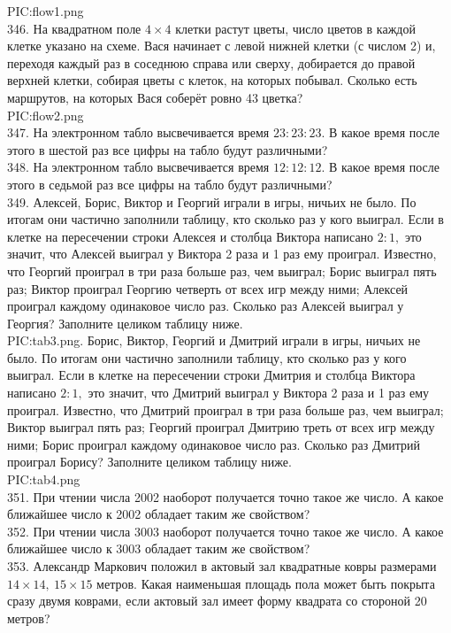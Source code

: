 {{PIC:flow1.png}}\\
346. На квадратном поле $4\times4$ клетки растут цветы, число цветов в каждой клетке указано на схеме. Вася начинает с левой нижней клетки (с числом 2) и, переходя каждый раз в соседнюю справа или сверху, добирается до правой верхней клетки, собирая цветы с клеток, на которых побывал. Сколько есть маршрутов, на которых Вася соберёт ровно 43 цветка?\\
{{PIC:flow2.png}}\\
347. На электронном табло высвечивается время $23:23:23.$ В какое время после этого в шестой раз все цифры на табло будут различными?\\
348. На электронном табло высвечивается время $12:12:12.$ В какое время после этого в седьмой раз все цифры на табло будут различными?\\
349. Алексей, Борис, Виктор и Георгий играли в игры, ничьих не было. По итогам они частично заполнили таблицу, кто сколько раз у кого выиграл. Если в клетке на пересечении строки Алексея и столбца Виктора написано $2:1,$ это значит, что Алексей выиграл у Виктора 2 раза и 1 раз ему проиграл. Известно, что Георгий проиграл в три раза больше раз, чем выиграл; Борис выиграл пять раз; Виктор проиграл Георгию четверть от всех игр между ними; Алексей проиграл каждому одинаковое число раз. Сколько раз Алексей выиграл у Георгия? Заполните целиком таблицу ниже.\\
{{PIC:tab3.png}}\newpage{}. Борис, Виктор, Георгий и Дмитрий играли в игры, ничьих не было. По итогам они частично заполнили таблицу, кто сколько раз у кого выиграл. Если в клетке на пересечении строки Дмитрия и столбца Виктора написано $2:1,$ это значит, что Дмитрий выиграл у Виктора 2 раза и 1 раз ему проиграл. Известно, что Дмитрий проиграл в три раза больше раз, чем выиграл; Виктор выиграл пять раз; Георгий проиграл Дмитрию треть от всех игр между ними; Борис проиграл каждому одинаковое число раз. Сколько раз Дмитрий проиграл Борису? Заполните целиком таблицу ниже.\\
{{PIC:tab4.png}}\\
351. При чтении числа 2002 наоборот получается точно такое же число. А какое ближайшее число к 2002 обладает таким же свойством?\\
352. При чтении числа 3003 наоборот получается точно такое же число. А какое ближайшее число
к 3003 обладает таким же свойством?\\
353. Александр Маркович положил в актовый зал квадратные ковры размерами $14 \times 14,\ 15 \times 15$ метров. Какая наименьшая площадь пола может быть покрыта сразу двумя коврами, если актовый зал имеет форму квадрата со стороной 20 метров?\\
